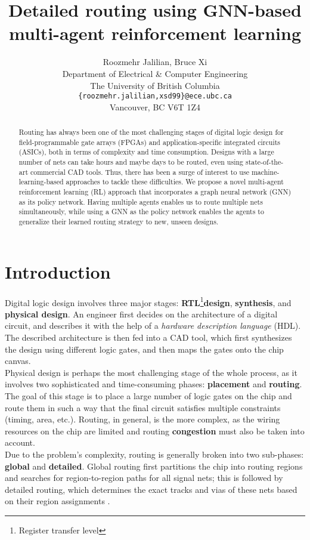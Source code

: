 \documentclass[letterpaper]{article}
\title{Detailed routing using GNN-based multi-agent reinforcement learning}
\author{%
    Roozmehr Jalilian, Bruce Xi \\
    Department of Electrical \& Computer Engineering \\
    The University of British Columbia \\
    \texttt{\{roozmehr.jalilian,xsd99\}@ece.ubc.ca} \\
    Vancouver, BC V6T 1Z4
}
\begin{document}
\maketitle


\begin{abstract}
    Routing has always been one of the most challenging stages of digital logic design for field-programmable gate arrays (FPGAs) and application-specific integrated circuits (ASICs), both in terms of complexity and time consumption. Designs with a large number of nets can take hours and maybe days to be routed, even using state-of-the-art commercial CAD tools. Thus, there has been a surge of interest to use machine-learning-based approaches to tackle these difficulties. We propose a novel multi-agent reinforcement learning (RL) approach that incorporates a graph neural network (GNN) as its policy network. Having multiple agents enables us to route multiple nets simultaneously, while using a GNN as the policy network enables the agents to generalize their learned routing strategy to new, unseen designs.
\end{abstract}


\section{Introduction}


    Digital logic design involves three major stages: {\bf RTL}\footnote{Register transfer level}{\bf design}, {\bf synthesis}, and {\bf physical design}. An engineer first decides on the architecture of a digital circuit, and describes it with the help of a {\it hardware description language} (HDL). The described architecture is then fed into a CAD tool, which first synthesizes the design using different logic gates, and then maps the gates onto the chip canvas. \\
    
    Physical design is perhaps the most challenging stage of the whole process, as it involves two sophisticated and time-consuming phases: {\bf placement} and {\bf routing}. The goal of this stage is to place a large number of logic gates on the chip and route them in such a way that the final circuit satisfies multiple constraints (timing, area, etc.). Routing, in general, is the more complex, as the wiring resources on the chip are limited and routing {\bf congestion} must also be taken into account. \\
    
    Due to the problem's complexity, routing is generally broken into two sub-phases: {\bf global} and {\bf detailed}. Global routing first partitions the chip into routing regions and searches for region-to-region paths for all signal nets; this is followed by detailed routing, which determines the exact tracks and vias of these nets based on their region assignments \cite{Kahng2022}. \\
    
\end{document}
